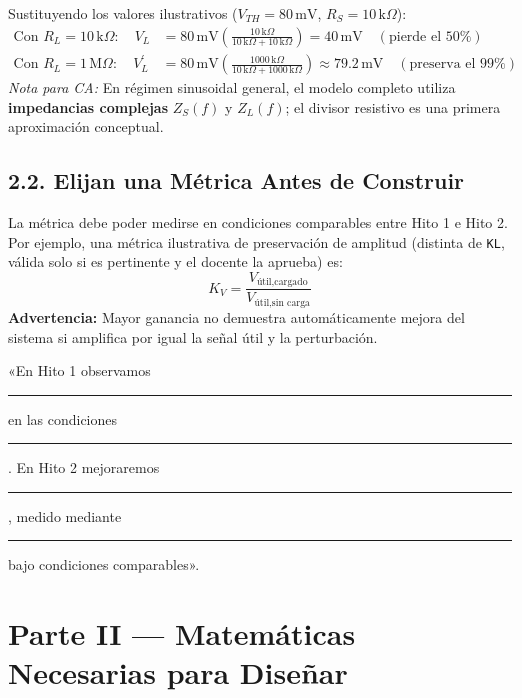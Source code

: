 \documentclass[10pt, a4paper]{article}
\begin{document}
Sustituyendo los valores ilustrativos ($V_{TH}=80\,\text{mV}$, $R_S=10\,\text{k}\Omega$):
\begin{align}
    \text{Con } R_L = 10\,\text{k}\Omega: \quad V_L &= 80\,\text{mV}\left(\frac{10\,\text{k}\Omega}{10\,\text{k}\Omega + 10\,\text{k}\Omega}\right) = 40\,\text{mV} \quad (\text{pierde el } 50\%) \\
    \text{Con } R_L = 1\,\text{M}\Omega: \quad V_L^\prime &= 80\,\text{mV}\left(\frac{1000\,\text{k}\Omega}{10\,\text{k}\Omega + 1000\,\text{k}\Omega}\right) \approx 79.2\,\text{mV} \quad (\text{preserva el } 99\%)
\end{align}
\textit{Nota para CA:} En régimen sinusoidal general, el modelo completo utiliza \textbf{impedancias complejas} $Z_S(f)$ y $Z_L(f)$; el divisor resistivo es una primera aproximación conceptual.

\subsection*{2.2. Elijan una Métrica Antes de Construir}
La métrica debe poder medirse en condiciones comparables entre Hito 1 e Hito 2. Por ejemplo, una métrica ilustrativa de preservación de amplitud (distinta de \texttt{KL}, válida solo si es pertinente y el docente la aprueba) es:
\begin{equation}
    K_V = \frac{V_{\text{útil,cargado}}}{V_{\text{útil,sin carga}}}
\end{equation}
\textbf{Advertencia:} Mayor ganancia no demuestra automáticamente mejora del sistema si amplifica por igual la señal útil y la perturbación.

\begin{tcolorbox}[colback=neutralbg, colframe=black, title=\textbf{Entregable Obligatorio — Parte I}]
    «En Hito 1 observamos \rule{3cm}{0.4pt} en las condiciones \rule{3cm}{0.4pt}. En Hito 2 mejoraremos \rule{3cm}{0.4pt}, medido mediante \rule{3cm}{0.4pt} bajo condiciones comparables».
\end{tcolorbox}

\section*{Parte II — Matemáticas Necesarias para Diseñar}
\end{document}
